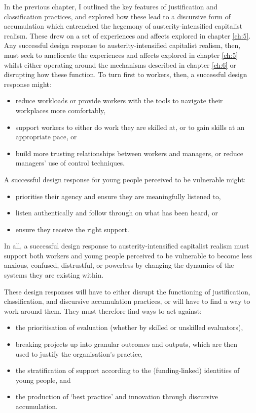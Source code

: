 In the previous chapter, I outlined the key features of justification and classification practices, and explored how these lead to a discursive form of accumulation which entrenched the hegemony of austerity-intensified capitalist realism. These drew on a set of experiences and affects explored in chapter \ref{ch:5}. Any successful design response to austerity-intensified capitalist realism, then, must seek to ameliorate the experiences and affects explored in chapter \ref{ch:5} whilst either operating around the mechanisms described in chapter \ref{ch:6} or disrupting how these function. To turn first to workers, then, a successful design response might:
\begin{itemize}
    \item reduce workloads or provide workers with the tools to navigate their workplaces more comfortably,
    \item support workers to either do work they are skilled at, or to gain skills at an appropriate pace, or
    \item build more trusting relationships between workers and managers, or reduce managers' use of control techniques.
\end{itemize}
A successful design response for young people perceived to be vulnerable might:
\begin{itemize}
    \item prioritise their agency and ensure they are meaningfully listened to,
    \item listen authentically and follow through on what has been heard, or
    \item ensure they receive the right support. 
\end{itemize}
In all, a successful design response to austerity-intensified capitalist realism must support both workers and young people perceived to be vulnerable to become less anxious, confused, distrustful, or powerless by changing the dynamics of the systems they are existing within. 

These design responses will have to either disrupt the functioning of justification, classification, and discursive accumulation practices, or will have to find a way to work around them. They must therefore find ways to act against:
\begin{itemize}
    \item the prioritisation of evaluation (whether by skilled or unskilled evaluators),
    \item breaking projects up into granular outcomes and outputs, which are then used to justify the organisation's practice,
    \item the stratification of support according to the (funding-linked) identities of young people, and
    \item the production of `best practice' and innovation through discursive accumulation.
\end{itemize}


